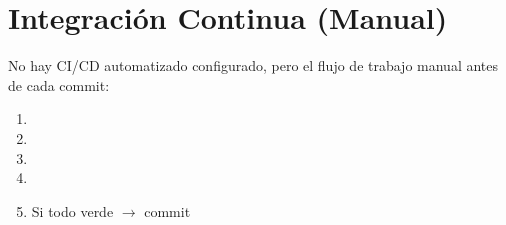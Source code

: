 \section{Integración Continua (Manual)}
\label{sec:ci}

No hay CI/CD automatizado configurado, pero el flujo de trabajo manual antes de cada commit:
\begin{enumerate}
\item {}
\item {}
\item {}
\item {}
\item Si todo verde $\to$ commit
\end{enumerate}